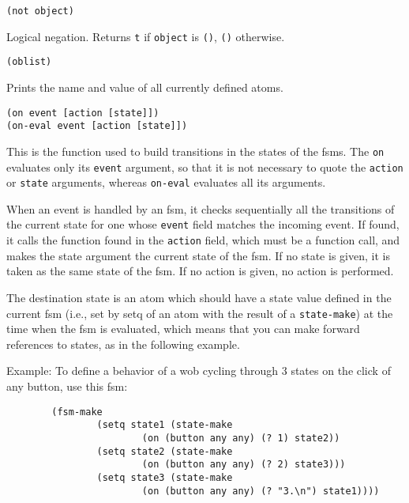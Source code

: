 {\usagefont\begin{verbatim}
(not object)
\end{verbatim}}\usageupspace

Logical negation. Returns \verb"t" if \verb"object" is \verb"()",
\verb"()" otherwise.

        
{\usagefont\begin{verbatim}
(oblist)
\end{verbatim}}\usageupspace

Prints the name and value of all currently defined {\WOOL} atoms.

        
{\usagefont\begin{verbatim}
(on event [action [state]])
(on-eval event [action [state]])
\end{verbatim}}\usageupspace

This is the function used to build transitions in the states of the fsms.
The \verb"on" evaluates only its \verb"event" argument, so that it is not
necessary to quote the \verb"action" or \verb"state" arguments, whereas
\verb"on-eval" evaluates all its arguments.

When an event is handled by an fsm, it checks sequentially all the
transitions of the current state for one whose \verb"event" field matches
the incoming event. If found, it calls the {\WOOL} function found in the
\verb"action" field, which must be a function call, and makes the
state argument the current state of the fsm. If no  state is given, it is
taken as the same state of the fsm. If no action is given, no action is
performed.

The destination state is an atom which should have a state value defined in
the current fsm (i.e., set by setq of an atom 
with the result of a \verb"state-make") at
the time when the fsm is evaluated, which means that you can make forward
references to states, as in the following example.

Example: To define a behavior of a wob cycling through 3 states on the
click of any button, use this fsm:

{\exemplefont\begin{verbatim}
        (fsm-make 
                (setq state1 (state-make
                        (on (button any any) (? 1) state2))
                (setq state2 (state-make
                        (on (button any any) (? 2) state3)))
                (setq state3 (state-make
                        (on (button any any) (? "3.\n") state1))))
\end{verbatim}}

